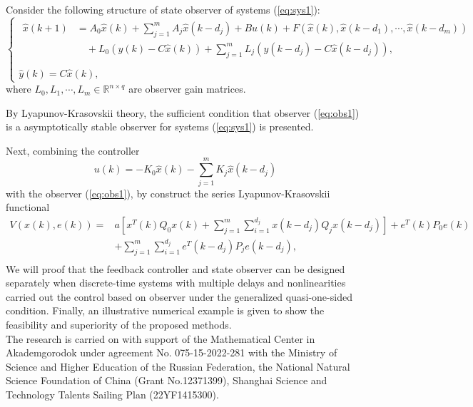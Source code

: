 \documentclass[12pt]{llncs}
\begin{document}
\par Consider the following structure of state observer of systems (\ref{eq:sys1}):
\begin{equation}\label{eq:obs1}
  \left\{
  \begin{array}{ll}
  \begin{split}
    \hat{x}(k+1)&=A_{0}\hat{x}(k)+\sum_{j=1}^{m}A_{j}\hat{x}(k-d_{j})+Bu(k)+F(\hat{x}(k),\hat{x}(k-d_{1}),\cdots,\hat{x}(k-d_{m}))\\
      &\quad+L_{0}(y(k)-C\hat{x}(k))+\sum_{j=1}^{m}L_{j}(y(k-d_{j})-C\hat{x}(k-d_{j})), \\
  \end{split}
\\
    \hat{y}(k)=C\hat{x}(k),
  \end{array}
\right.
\end{equation}
where $L_{0},L_{1},\cdots,L_{m}\in \mathbb R^{n\times q}$ are observer gain matrices.

\par By Lyapunov-Krasovskii theory, the sufficient condition that observer (\ref{eq:obs1}) is a asymptotically stable observer for systems (\ref{eq:sys1}) is presented.
\par Next, combining the controller
\begin{equation}\label{eq:controller2}
  u(k)=-K_{0}\hat{x}(k)-\sum_{j=1}^{m}K_{j}\hat{x}(k-d_{j})
\end{equation}
with the observer (\ref{eq:obs1}), by construct the series Lyapunov-Krasovskii functional
\begin{equation}
\begin{split}
V(x(k),e(k))=&a[x^{T}(k)Q_{0}x(k)+\sum_{j=1}^{m}\sum_{i=1}^{d_{j}}x(k-d_{j})Q_{j}x(k-d_{j})]+e^{T}(k)P_{0}e(k)\\
&+\sum_{j=1}^{m}\sum_{i=1}^{d_{j}}e^{T}(k-d_{j})P_{j}e(k-d_{j}), \\
\end{split}
\end{equation}
We will proof that the feedback controller and state observer can be designed separately when discrete-time systems with multiple delays and nonlinearities carried out the control based on observer under the generalized quasi-one-sided condition. Finally, an illustrative numerical example is given to show the feasibility and superiority of the proposed methods.\\



The research is carried on with support of the Mathematical Center in Akademgorodok under agreement No. 075-15-2022-281 with the Ministry of Science and Higher Education of the Russian Federation, the National Natural Science Foundation of China (Grant No.12371399), Shanghai Science and Technology Talents Sailing Plan (22YF1415300).
\end{document}
